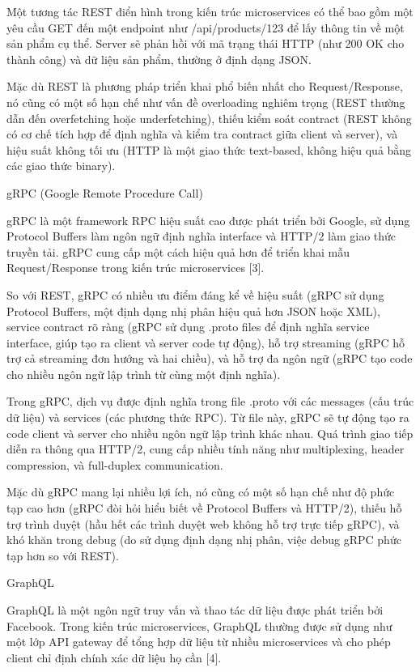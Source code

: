 Một tương tác REST điển hình trong kiến trúc microservices có thể bao gồm một yêu cầu GET đến một endpoint như /api/products/123 để lấy thông tin về một sản phẩm cụ thể. Server sẽ phản hồi với mã trạng thái HTTP (như 200 OK cho thành công) và dữ liệu sản phẩm, thường ở định dạng JSON.

Mặc dù REST là phương pháp triển khai phổ biến nhất cho Request/Response, nó cũng có một số hạn chế như vấn đề overloading nghiêm trọng (REST thường dẫn đến overfetching hoặc underfetching), thiếu kiểm soát contract (REST không có cơ chế tích hợp để định nghĩa và kiểm tra contract giữa client và server), và hiệu suất không tối ưu (HTTP là một giao thức text-based, không hiệu quả bằng các giao thức binary).

gRPC (Google Remote Procedure Call)

gRPC là một framework RPC hiệu suất cao được phát triển bởi Google, sử dụng Protocol Buffers làm ngôn ngữ định nghĩa interface và HTTP/2 làm giao thức truyền tải. gRPC cung cấp một cách hiệu quả hơn để triển khai mẫu Request/Response trong kiến trúc microservices [3].

So với REST, gRPC có nhiều ưu điểm đáng kể về hiệu suất (gRPC sử dụng Protocol Buffers, một định dạng nhị phân hiệu quả hơn JSON hoặc XML), service contract rõ ràng (gRPC sử dụng .proto files để định nghĩa service interface, giúp tạo ra client và server code tự động), hỗ trợ streaming (gRPC hỗ trợ cả streaming đơn hướng và hai chiều), và hỗ trợ đa ngôn ngữ (gRPC tạo code cho nhiều ngôn ngữ lập trình từ cùng một định nghĩa).

Trong gRPC, dịch vụ được định nghĩa trong file .proto với các messages (cấu trúc dữ liệu) và services (các phương thức RPC). Từ file này, gRPC sẽ tự động tạo ra code client và server cho nhiều ngôn ngữ lập trình khác nhau. Quá trình giao tiếp diễn ra thông qua HTTP/2, cung cấp nhiều tính năng như multiplexing, header compression, và full-duplex communication.

Mặc dù gRPC mang lại nhiều lợi ích, nó cũng có một số hạn chế như độ phức tạp cao hơn (gRPC đòi hỏi hiểu biết về Protocol Buffers và HTTP/2), thiếu hỗ trợ trình duyệt (hầu hết các trình duyệt web không hỗ trợ trực tiếp gRPC), và khó khăn trong debug (do sử dụng định dạng nhị phân, việc debug gRPC phức tạp hơn so với REST).

GraphQL

GraphQL là một ngôn ngữ truy vấn và thao tác dữ liệu được phát triển bởi Facebook. Trong kiến trúc microservices, GraphQL thường được sử dụng như một lớp API gateway để tổng hợp dữ liệu từ nhiều microservices và cho phép client chỉ định chính xác dữ liệu họ cần [4].

